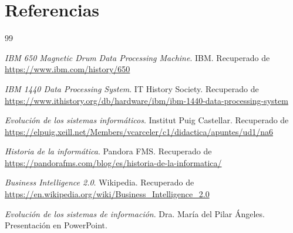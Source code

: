 \documentclass[12pt]{article}
\numberwithin{equation}{section}
\numberwithin{figure}{section}
\numberwithin{table}{section}
\begin{document}
\section{Referencias}
\begin{thebibliography}{99}

\textit{IBM 650 Magnetic Drum Data Processing Machine}. IBM. Recuperado de \url{https://www.ibm.com/history/650}

\textit{IBM 1440 Data Processing System}. IT History Society. Recuperado de \url{https://www.ithistory.org/db/hardware/ibm/ibm-1440-data-processing-system}

\textit{Evolución de los sistemas informáticos}. Institut Puig Castellar. Recuperado de \url{https://elpuig.xeill.net/Members/vcarceler/c1/didactica/apuntes/ud1/na6}

\textit{Historia de la informática}. Pandora FMS. Recuperado de \url{https://pandorafms.com/blog/es/historia-de-la-informatica/}

\textit{Business Intelligence 2.0}. Wikipedia. Recuperado de \url{https://en.wikipedia.org/wiki/Business_Intelligence_2.0}

\textit{Evolución de los sistemas de información}. Dra. María del Pilar Ángeles. Presentación en PowerPoint.

\end{thebibliography}

\pagebreak
\end{document}
